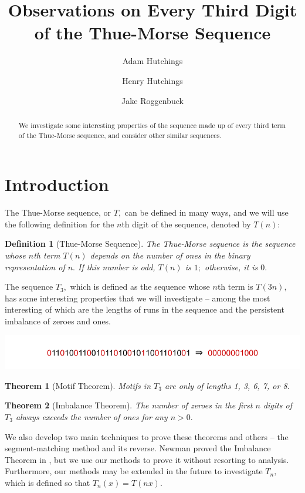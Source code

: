\documentclass{article}
\newtheorem{theorem}{Theorem}[section]
\newtheorem{definition}{Definition}[section]
\begin{document}
\title{Observations on Every Third Digit of the Thue-Morse Sequence}
\author{
	Adam Hutchings
	\and
	Henry Hutchings
	\and
	Jake Roggenbuck
}
\maketitle

\begin{abstract}
We investigate some interesting properties of the sequence made up of every third term of the Thue-Morse sequence, and consider other similar sequences.
\end{abstract}

\tableofcontents

\section{Introduction}
The Thue-Morse sequence, or $T,$ can be defined in many ways, and we will use the following definition for the $n$th digit of the sequence, denoted by $T(n):$ 

\begin{definition}[Thue-Morse Sequence]
The Thue-Morse sequence is the sequence whose $n$th term $T(n)$ depends on the number of ones in the binary representation of $n.$ If this number is odd, $T(n)$ is $1;$ otherwise, it is $0.$
\end{definition}

The sequence $T_3,$ which is defined as the sequence whose $n$th term is $T(3n),$ has some interesting properties that we will investigate -- among the most interesting of which are the lengths of runs in the sequence and the persistent imbalance of zeroes and ones.

\includegraphics[scale=0.4]{t_t3}

\begin{theorem}[Motif Theorem]
\label{mlength}
Motifs in $T_3$ are only of lengths 1, 3, 6, 7, or 8.
\end{theorem}

\begin{theorem}[Imbalance Theorem]
\label{ratio}
The number of zeroes in the first $n$ digits of $T_3$ always exceeds the number of ones for any $n > 0.$
\end{theorem}

We also develop two main techniques to prove these theorems and others -- the segment-matching method and its reverse. Newman proved the Imbalance Theorem in \cite{analysis}, but we use our methods to prove it without resorting to analysis. Furthermore, our methods may be extended in the future to investigate $T_n,$ which is defined so that $T_n(x) = T(nx).$
\end{document}
